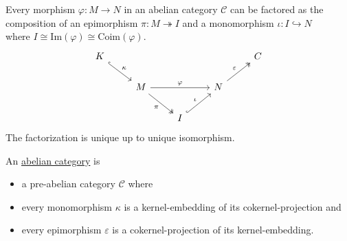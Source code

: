 \begin{corollary}\label{cor:epi_mono_factorization}
Every morphism $\varphi : M \rightarrow N$ in an abelian category $\mathcal{C}$ can be factored as the
composition of an epimorphism $\pi : M \twoheadrightarrow I$ and a monomorphism $\iota : I \hookrightarrow N$\\
where $I \cong \mathrm{Im}(\varphi) \cong \mathrm{Coim}(\varphi)$.
\[
\begin{tikzcd}
K \arrow[rd, "\kappa", hook] &                                                       &                             &                                        & C \\
                             & M \arrow[rr, "\varphi"] \arrow[rd, "\pi"', two heads] &                             & N \arrow[ru, "\varepsilon", two heads] &   \\
                             &                                                       & I \arrow[ru, "\iota", hook] &                                        &  
\end{tikzcd}
\]
The factorization is unique up to unique isomorphism.
\end{corollary}

\begin{definition}
An \ul{abelian category} is
\begin{itemize}
\item a pre-abelian category $\mathcal{C}$ where
\item every monomorphism $\kappa$ is a kernel-embedding of its cokernel-projection and
\item every epimorphism $\varepsilon$ is a cokernel-projection of  its kernel-embedding.
\end{itemize}
\end{definition}

